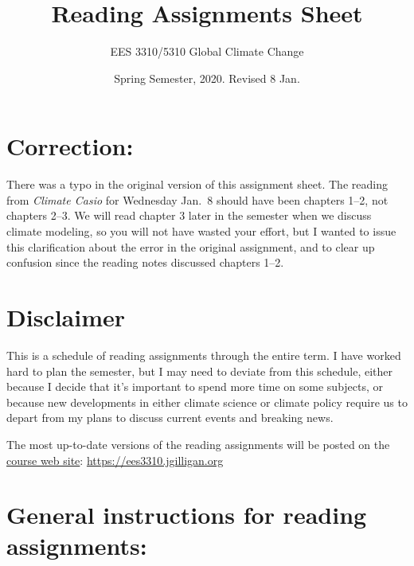 \documentclass[
]{article}
\title{Reading Assignments Sheet}
\author{EES 3310/5310 Global Climate Change}
\date{Spring Semester, 2020. Revised 8 Jan.}
\begin{document}
\maketitle

\hypertarget{correction}{%
\section{Correction:}\label{correction}}

There was a typo in the original version of this assignment sheet. The
reading from \emph{Climate Casio} for Wednesday Jan.~8 should have been
chapters 1--2, not chapters 2--3. We will read chapter 3 later in the
semester when we discuss climate modeling, so you will not have wasted
your effort, but I wanted to issue this clarification about the error in
the original assignment, and to clear up confusion since the reading
notes discussed chapters 1--2.

\hypertarget{disclaimer}{%
\section{Disclaimer}\label{disclaimer}}

This is a schedule of reading assignments through the entire term. I
have worked hard to plan the semester, but I may need to deviate from
this schedule, either because I decide that it's important to spend more
time on some subjects, or because new developments in either climate
science or climate policy require us to depart from my plans to discuss
current events and breaking news.

The most up-to-date versions of the reading assignments will be posted
on the \href{https://ees3310.jgilligan.org}{course web site}:
\url{https://ees3310.jgilligan.org}

\hypertarget{general-instructions-for-reading-assignments}{%
\section{General instructions for reading
assignments:}\label{general-instructions-for-reading-assignments}}
\end{document}
